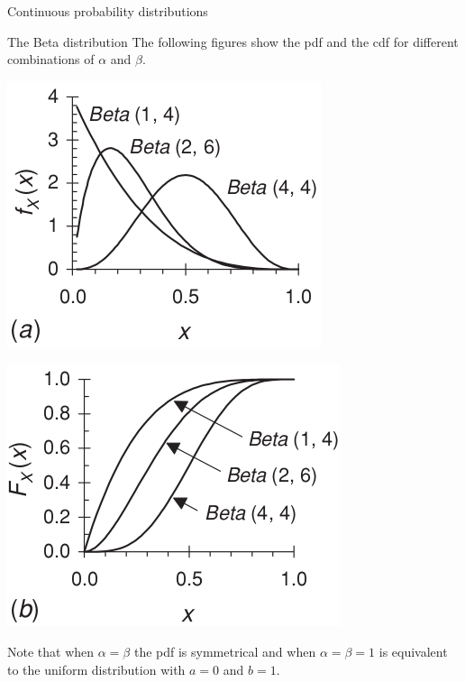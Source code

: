 \documentclass[8pt]{beamer}
\renewcommand{\emph}[1]{\textcolor{myorange}{#1}}
\begin{document}
\begin{frame}{Continuous probability distributions} 
    \begin{block}{The \alert{Beta} distribution}
        The following figures show the \emph{pdf} and the \emph{cdf} for different combinations of $\alpha$ and $\beta$.
               \end{block}
   \vspace{-5pt}
\begin{minipage}{0.49\textwidth}
\centering
\includegraphics[width=0.8\linewidth]{fi425a.png}  %
\end{minipage}
\hfill
\begin{minipage}{0.49\textwidth}
\centering
\includegraphics[width=0.8\linewidth]{fi425b.png} %
\end{minipage}
Note that when $\alpha = \beta$ the \emph{pdf} is symmetrical and when $\alpha=\beta=1$ is equivalent to the \emph{uniform distribution} with $a=0$ and $b=1$.
\end{frame}
\end{document}
